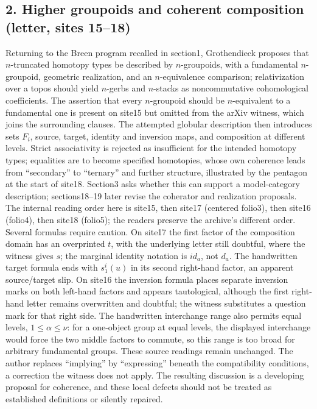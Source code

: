 \subsection*{2. Higher groupoids and coherent composition (letter, sites 15--18)}
Returning to the Breen program recalled in section1, Grothendieck proposes that $n$-truncated homotopy types be described by $n$-groupoids, with a fundamental $n$-groupoid, geometric realization, and an $n$-equivalence comparison; relativization over a topos should yield $n$-gerbs and $n$-stacks as noncommutative cohomological coefficients. The assertion that every $n$-groupoid should be $n$-equivalent to a fundamental one is present on site15 but omitted from the arXiv witness, which joins the surrounding clauses. The attempted globular description then introduces sets $F_i$, source, target, identity and inversion maps, and composition at different levels. Strict associativity is rejected as insufficient for the intended homotopy types; equalities are to become specified homotopies, whose own coherence leads from ``secondary'' to ``ternary'' and further structure, illustrated by the pentagon at the start of site18. Section3 asks whether this can support a model-category description; sections18--19 later revise the coherator and realization proposals. The internal reading order here is site15, then site17 (centered folio3), then site16 (folio4), then site18 (folio5); the readers preserve the archive's different order. Several formulas require caution. On site17 the first factor of the composition domain has an overprinted $t$, with the underlying letter still doubtful, where the witness gives $s$; the marginal identity notation is $id_a$, not $d_a$. The handwritten target formula ends with $s^i_1(u)$ in its second right-hand factor, an apparent source/target slip. On site16 the inversion formula places separate inversion marks on both left-hand factors and appears tautological, although the first right-hand letter remains overwritten and doubtful; the witness substitutes a question mark for that right side. The handwritten interchange range also permits equal levels, $1\leq\alpha\leq\nu$: for a one-object group at equal levels, the displayed interchange would force the two middle factors to commute, so this range is too broad for arbitrary fundamental groups. These source readings remain unchanged. The author replaces ``implying'' by ``expressing'' beneath the compatibility conditions, a correction the witness does not apply. The resulting discussion is a developing proposal for coherence, and these local defects should not be treated as established definitions or silently repaired.

